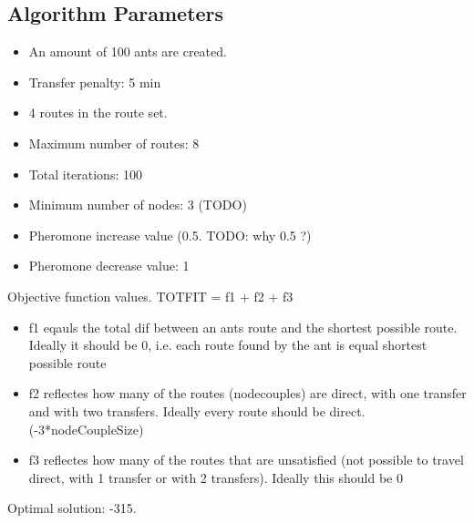 \subsection{Algorithm Parameters}

\begin{itemize}
\item An amount of 100 ants are created. 
\item Transfer penalty: 5 min
\item 4 routes in the route set.
\item Maximum number of routes: 8
\item Total iterations: 100
\item Minimum number of nodes: 3 (TODO)
\item Pheromone increase value (0.5. TODO: why 0.5 ?)
\item Pheromone decrease value: 1
\end{itemize}

Objective function values. TOTFIT = f1 + f2 + f3
\begin{itemize}
\item f1 eqauls the total dif between an ants route and the shortest possible route. Ideally it should be 0, i.e. each route found by the ant is equal shortest possible route
\item f2 reflectes how many of the routes (nodecouples) are direct, with one transfer and with two transfers. Ideally every route should be direct. (-3*nodeCoupleSize)
\item f3 reflectes how many of the routes that are unsatisfied (not possible to travel direct, with 1 transfer or with 2 transfers). Ideally this should be 0
\end{itemize}
Optimal solution: -315.